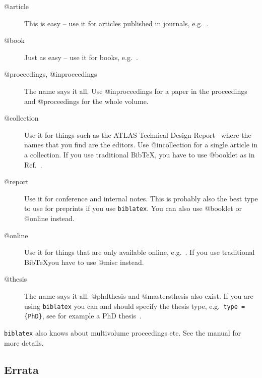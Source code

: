 \documentclass[UKenglish, texlive=2016]{\ATLASLATEXPATH atlasdoc}
\newcommand*{\BibTeX}{Bib\TeX}
\newcommand{\Option}[1]{\textsf{#1}\xspace}
\newcommand{\Package}[1]{\texttt{#1}\xspace}
\begin{document}
\begin{description}
\item[@article] This is easy -- use it for articles published in
  journals, e.g.~\cite{lhcCollaboration:2012}.
\item[@book] Just as easy -- use it for books, e.g.~\cite{kopka04}.
\item[@proceedings, @inproceedings] The name says it all. Use
  \Option{@inproceedings} for a paper in the proceedings and
  \Option{@proceedings} for the whole volume.
\item[@collection] Use it for things such as the ATLAS Technical Design
  Report~\cite{lhc:vol1a} where the names that you find are the
  editors. Use \Option{@incollection} for a single article in a
  collection.
  If you use traditional \BibTeX, you have to use \Option{@booklet} as in Ref.~\cite{lhc:vol1b}.
\item[@report] Use it for conference and
  internal notes. This is
  probably also the best type to use for preprints if you use \Package{biblatex}.
  You can also use \Option{@booklet} or \Option{@online} instead.
\item[@online] Use it for things that are only available online,
  e.g.~\cite{lshort}.
  If you use traditional \BibTeX you have to use \Option{@misc} instead.
\item[@thesis] The name says it all.
  \Option{@phdthesis} and
  \Option{@mastersthesis}
  also exist. If you are using \Package{biblatex} you can and should specify
  the thesis type, e.g.\ \texttt{type = \{PhD\}}, see for example a
  PhD thesis~\cite{tlodd:2012}.
\end{description}

\Package{biblatex} also knows about multivolume proceedings etc.
See the manual for more details.


\subsection{Errata}
\label{sec:erratum}
\end{document}
